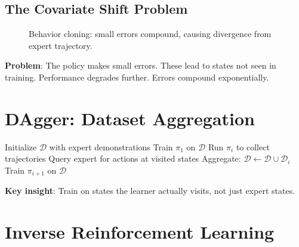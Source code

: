 \subsection{The Covariate Shift Problem}

\begin{figure}[h]
\centering
{}
\caption{Behavior cloning: small errors compound, causing divergence from expert trajectory.}
\end{figure}

\textbf{Problem}: The policy makes small errors. These lead to states not seen in training. Performance degrades further. Errors compound exponentially.


\section{DAgger: Dataset Aggregation}


\begin{algorithm}[H]
\caption{DAgger}
\begin{algorithmic}[1]
\State Initialize $\mathcal{D}$ with expert demonstrations
\State Train $\pi_1$ on $\mathcal{D}$
    \State Run $\pi_i$ to collect trajectories
    \State Query expert for actions at visited states
    \State Aggregate: $\mathcal{D} \gets \mathcal{D} \cup \mathcal{D}_i$
    \State Train $\pi_{i+1}$ on $\mathcal{D}$
\EndFor
\end{algorithmic}
\end{algorithm}

\textbf{Key insight}: Train on states the learner actually visits, not just expert states.


\section{Inverse Reinforcement Learning}


